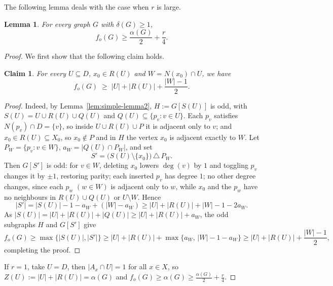 \documentclass[11pt]{article}
\newtheorem{lemma}[theorem]{Lemma}
\newtheorem{claim}[theorem]{Claim}
\theoremstyle{definition}
\theoremstyle{remark}
\newcommand{\1}{\mathbf{1}}
\begin{document}
	The following lemma deals with the case when $r$ is large. 
	
	\begin{lemma}\label{lem:bound2}
		For every graph $G$ with $\delta(G)\geq 1$,
		\[f_o(G) \ge \dfrac{\alpha(G)}{2} + \dfrac{r}{4}.\]
	\end{lemma}
	
	\begin{proof}
		We first show that the following claim holds.
		\begin{claim}\label{eq:exchange}
			For every $U \subseteq D$, $x_0 \in R(U)$ and $W = N(x_0) \cap U$, we have 
			\[f_o(G) \;\ge\; |U| + |R(U)| + \frac{|W| - 1}{2}.\]
		\end{claim}
		\begin{proof}
			Indeed, by Lemma~\ref{lem:simple-lemma2}, $H := G[S(U)]$ is odd, with $S(U) = U \cup R(U) \cup Q(U)$ and
			$Q(U) \subseteq \{p_v : v \in U\}$. Each $p_v$ satisfies $N(p_v) \cap D = \{v\}$,
			so inside $U \cup R(U) \cup P$ it is adjacent only to $v$; and
			$x_0 \in R(U) \subseteq X_0$, so $x_0 \notin P$ and in $H$ the vertex $x_0$ is
			adjacent exactly to $W$. Let $P_W = \{p_v : v \in W\}$,
			$a_W = |Q(U) \cap P_W|$, and set
			\[
			S' = \bigl(S(U) \setminus \{x_0\}\bigr) \,\triangle\, P_W .
			\]
			Then $G[S']$ is odd: for $v \in W$, deleting $x_0$ lowers $\deg(v)$ by $1$ and
			toggling $p_v$ changes it by $\pm 1$, restoring parity; each inserted $p_v$ has
			degree $1$; no other degree changes, since each $p_w$ $(w\in W)$ is adjacent
			only to $w$, while $x_0$ and the $p_w$ have no neighbours in
			$R(U) \cup Q(U)$ or $U \setminus W$. Hence
			\[
			|S'| = |S(U)| - 1 - a_W + (|W| - a_W) \geq |U|+|R(U)| + |W| - 1 - 2a_W .
			\]
			As $|S(U)| = |U| + |R(U)| + |Q(U)| \ge |U| + |R(U)| + a_W$, the odd subgraphs
			$H$ and $G[S']$ give
			\[
			f_o(G) \ge \max\{|S(U)|, |S'|\}
			\ge |U| + |R(U)| + \max\{a_W,\, |W| - 1 - a_W\}
			\ge |U| + |R(U)| + \frac{|W| - 1}{2},
			\]
			completing the proof.
		\end{proof}
		
		If $r = 1$, take $U = D$, then $|A_x \cap U| = 1$ for all $x \in X$, so $Z(U) := |U| + |R(U)| = \alpha(G)$ and $f_o(G) \ge \alpha(G) \ge \frac {\alpha(G)}{2} + \frac r4$.
		

\end{proof}
\end{document}
